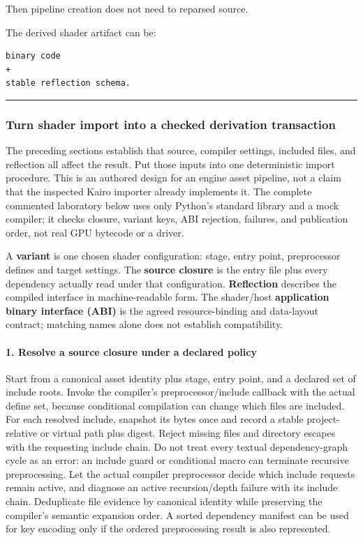 Then pipeline creation does not need to reparsed source.

The derived shader artifact can be:

\begin{verbatim}
binary code
+
stable reflection schema.
\end{verbatim}

\begin{center}\rule{0.5\linewidth}{0.5pt}\end{center}

\subsubsection{Turn shader import into a checked derivation transaction}\label{turn-shader-import-into-a-checked-derivation-transaction}

The preceding sections establish that source, compiler settings, included files, and reflection all affect the result. Put those inputs into one deterministic import procedure. This is an authored design for an engine asset pipeline, not a claim that the inspected Kairo importer already implements it. The complete commented laboratory below uses only Python's standard library and a mock compiler; it checks closure, variant keys, ABI rejection, failures, and publication order, not real GPU bytecode or a driver.

A \textbf{variant} is one chosen shader configuration: stage, entry point, preprocessor defines and target settings. The \textbf{source closure} is the entry file plus every dependency actually read under that configuration. \textbf{Reflection} describes the compiled interface in machine-readable form. The shader/host \textbf{application binary interface (ABI)} is the agreed resource-binding and data-layout contract; matching names alone does not establish compatibility.

\paragraph{1. Resolve a source closure under a declared policy}\label{resolve-a-source-closure-under-a-declared-policy}

Start from a canonical asset identity plus stage, entry point, and a declared set of include roots. Invoke the compiler's preprocessor/include callback with the actual define set, because conditional compilation can change which files are included. For each resolved include, snapshot its bytes once and record a stable project-relative or virtual path plus digest. Reject missing files and directory escapes with the requesting include chain. Do not treat every textual dependency-graph cycle as an error: an include guard or conditional macro can terminate recursive preprocessing. Let the actual compiler preprocessor decide which include requests remain active, and diagnose an active recursion/depth failure with its include chain. Deduplicate file evidence by canonical identity while preserving the compiler's semantic expansion order. A sorted dependency manifest can be used for key encoding only if the ordered preprocessing result is also represented.

